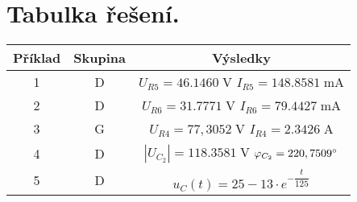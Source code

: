 \documentclass[a4paper,12pt]{article}
\begin{document}
\section{Tabulka řešení.}\par
\begin{center}
{\renewcommand{\arraystretch}{2.5}%
	\begin{tabular}{|c|c|c|} \hline 
        \textbf{Příklad} & \textbf{Skupina} & \textbf{Výsledky} \\ \hline
        1 & D & \hspace{1em}$U_{R5} = 46.1460\;\si{\volt}$ \qquad \qquad $I_{R5} = 148.8581 \;\si{\milli\ampere}$\hspace{1em} \\ \hline
        2 & D & $U_{R6} = 31.7771\;\si{\volt}$ \qquad \qquad $I_{R6} = 79.4427 \;\si{\milli\ampere}$ \\ \hline
        3 & G & $U_{R4} = 77,3052\;\si{\volt}$ \qquad \qquad $I_{R4} = 2.3426 \;\si{\ampere}$\\ \hline
        4 & D & $|U_{C_{2}}| = 118.3581\;\si{\volt}$ \qquad \qquad $\varphi_{C_{2}} = 220,7509\degree$ \\ \hline
        5 & D & $u_C(t) = 25-13\cdot e^{-\dfrac{t}{125}}$ \\ \hline
    \end{tabular}}
\end{center}
\end{document}
